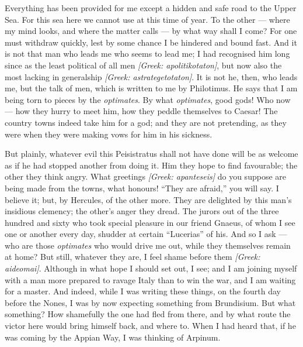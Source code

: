 

 Everything has been provided for me except a hidden and safe road to the Upper Sea. For this sea here we cannot use at this time of year. To the other --- where my mind looks, and where the matter calls --- by what way shall I come? For one must withdraw quickly, lest by some chance I be hindered and bound fast. And it is not that man who leads me who seems to lead me; I had recognised him long since as the least political of all men \textit{[Greek: apolitikotaton]}, but now also the most lacking in generalship \textit{[Greek: astrategetotaton]}. It is not he, then, who leads me, but the talk of men, which is written to me by Philotimus. He says that I am being torn to pieces by the \textit{optimates}. By what \textit{optimates}, good gods! Who now --- how they hurry to meet him, how they peddle themselves to Caesar! The country towns indeed take him for a god; and they are not pretending, as they were when they were making vows for him in his sickness.

 But plainly, whatever evil this Peisistratus shall not have done will be as welcome as if he had stopped another from doing it. Him they hope to find favourable; the other they think angry. What greetings \textit{[Greek: apanteseis]} do you suppose are being made from the towns, what honours! ``They are afraid,'' you will say. I believe it; but, by Hercules, of the other more. They are delighted by this man's insidious clemency; the other's anger they dread. The jurors out of the three hundred and sixty who took special pleasure in our friend Gnaeus, of whom I see one or another every day, shudder at certain ``Lucerias'' of his. And so I ask --- who are those \textit{optimates} who would drive me out, while they themselves remain at home? But still, whatever they are, I feel shame before them \textit{[Greek: aideomai]}. Although in what hope I should set out, I see; and I am joining myself with a man more prepared to ravage Italy than to win the war, and I am waiting for a master. And indeed, while I was writing these things, on the fourth day before the Nones, I was by now expecting something from Brundisium. But what something? How shamefully the one had fled from there, and by what route the victor here would bring himself back, and where to. When I had heard that, if he was coming by the Appian Way, I was thinking of Arpinum.
